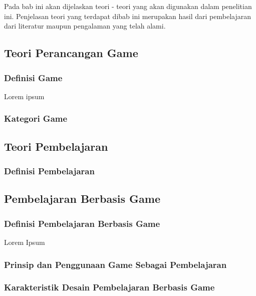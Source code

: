 \chapter{\babDua}
Pada bab ini akan dijelaskan teori - teori yang akan digunakan \saya dalam penelitian ini. Penjelasan teori yang terdapat dibab ini merupakan hasil dari pembelajaran \saya dari literatur maupun pengalaman yang telah \saya alami.
\section{Teori Perancangan Game}
	\subsection{Definisi Game}
	Lorem ipsum
	\subsection{Kategori Game}
	
\section{Teori Pembelajaran}
	\subsection{Definisi Pembelajaran}
	
\section{Pembelajaran Berbasis Game}
	\subsection{Definisi Pembelajaran Berbasis Game}
	Lorem Ipsum
	\subsection{Prinsip dan Penggunaan Game Sebagai Pembelajaran}
	\subsection{Karakteristik Desain Pembelajaran Berbasis Game}
	
